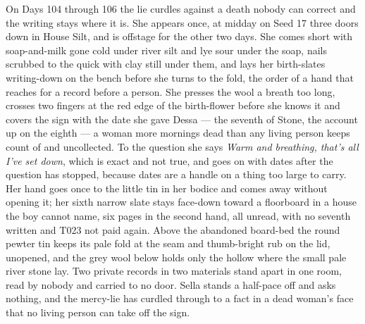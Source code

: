 \documentclass{design/chronicle}
\begin{document}
{On Days 104 through 106 the lie curdles against a death nobody can correct and the writing stays where it is. She appears once, at midday on Seed 17 three doors down in House Silt, and is offstage for the other two days. She comes short with soap-and-milk gone cold under river silt and lye sour under the soap, nails scrubbed to the quick with clay still under them, and lays her birth-slates writing-down on the bench before she turns to the fold, the order of a hand that reaches for a record before a person. She presses the wool a breath too long, crosses two fingers at the red edge of the birth-flower before she knows it and covers the sign with the date she gave Dessa --- the seventh of Stone, the account up on the eighth --- a woman more mornings dead than any living person keeps count of and uncollected. To the question she says \emph{Warm and breathing, that’s all I’ve set down}, which is exact and not true, and goes on with dates after the question has stopped, because dates are a handle on a thing too large to carry. Her hand goes once to the little tin in her bodice and comes away without opening it; her sixth narrow slate stays face-down toward a floorboard in a house the boy cannot name, six pages in the second hand, all unread, with no seventh written and T023 not paid again. Above the abandoned board-bed the round pewter tin keeps its pale fold at the seam and thumb-bright rub on the lid, unopened, and the grey wool below holds only the hollow where the small pale river stone lay. Two private records in two materials stand apart in one room, read by nobody and carried to no door. Sella stands a half-pace off and asks nothing, and the mercy-lie has curdled through to a fact in a dead woman’s face that no living person can take off the sign.

}
\end{document}
